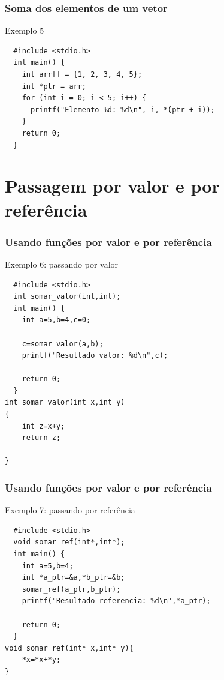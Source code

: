 \begin{frame}[fragile]
  \frametitle{Soma dos elementos de um vetor}
  \begin{block}{Exemplo 5}
  \begin{lstlisting}
  #include <stdio.h>
  int main() {
    int arr[] = {1, 2, 3, 4, 5};
    int *ptr = arr;
    for (int i = 0; i < 5; i++) {
      printf("Elemento %d: %d\n", i, *(ptr + i));
    }
    return 0;
  }
  \end{lstlisting}
  \end{block}
\end{frame}


\section{Passagem por valor e por referência}



\begin{frame}[fragile]{}
  \frametitle{Usando funções por valor e por referência}
  \begin{block}{Exemplo 6: passando por valor}
  \begin{lstlisting}
  #include <stdio.h>
  int somar_valor(int,int);
  int main() {
    int a=5,b=4,c=0;

    c=somar_valor(a,b);
    printf("Resultado valor: %d\n",c);

    return 0;
  }
int somar_valor(int x,int y)
{
    int z=x+y;
    return z;

}  
  \end{lstlisting}
  \end{block}
\end{frame}


\begin{frame}[fragile]{}
  \frametitle{Usando funções por valor e por referência}
  \begin{block}{Exemplo 7: passando por referência}
  \begin{lstlisting}
  #include <stdio.h>
  void somar_ref(int*,int*);
  int main() {
  	int a=5,b=4;
    int *a_ptr=&a,*b_ptr=&b;
    somar_ref(a_ptr,b_ptr);
    printf("Resultado referencia: %d\n",*a_ptr);

    return 0;
  }
void somar_ref(int* x,int* y){
    *x=*x+*y;
}
  \end{lstlisting}
  \end{block}
\end{frame}

